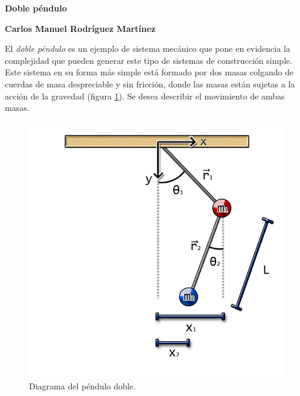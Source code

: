 \documentclass[letterpaper,11pt]{article}
\begin{document}
\begin{center}
{\bf \Large Doble péndulo} 
\end{center}

\noindent
{\bf \large Carlos Manuel Rodríguez Martínez} \hspace{5.2cm}

\smallskip
El \textit{doble péndulo} es un ejemplo de sistema mecánico que pone en evidencia la complejidad que pueden generar este tipo de sistemas de construcción simple. Este sistema en su forma más simple está formado por dos masas colgando de cuerdas de masa despreciable y sin fricción, donde las masas están sujetas a la acción de la gravedad (figura \ref{fig:penddoblediag}). Se desea describir el movimiento de ambas masas.

\begin{figure}[h!]
\centering
\includegraphics[scale=0.35]{img/PendDobleDiag}
\caption{Diagrama del péndulo doble.}
\label{fig:penddoblediag}
\end{figure}
\end{document}
